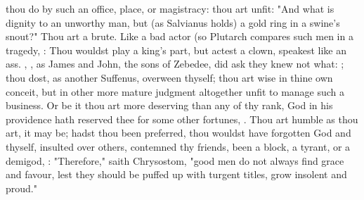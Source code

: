 {thou do by such an office, place, or magistracy: thou art unfit: "And what is dignity to an unworthy man, but (as Salvianus holds) a gold ring in a swine's snout?" Thou art a brute. Like a bad actor (so Plutarch compares such men in a tragedy, : Thou wouldst play a king's part, but actest a clown, speakest like an ass. , \etc{}, as James and John, the sons of Zebedee, did ask they knew not what: ; thou dost, as another Suffenus, overween thyself; thou art wise in thine own conceit, but in other more mature judgment altogether unfit to manage such a business. Or be it thou art more deserving than any of thy rank, God in his providence hath reserved thee for some other fortunes, . Thou art humble as thou art, it may be; hadst thou been preferred, thou wouldst have forgotten God and thyself, insulted over others, contemned thy friends, been a block, a tyrant, or a demigod, : "Therefore," saith Chrysostom, "good men do not always find grace and favour, lest they should be puffed up with turgent titles, grow insolent and proud."

}
